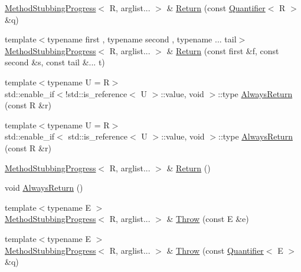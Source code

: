 \begin{DoxyCompactItemize}
\mbox{\hyperlink{structfakeit_1_1MethodStubbingProgress}{Method\+Stubbing\+Progress}}$<$ R, arglist... $>$ \& \mbox{\hyperlink{structfakeit_1_1MethodStubbingProgress_acb4d4db8208a8eaadff77e7cbf3775db}{Return}} (const \mbox{\hyperlink{structfakeit_1_1Quantifier}{Quantifier}}$<$ R $>$ \&q)
\item 
{\footnotesize template$<$typename first , typename second , typename ... tail$>$ }\\\mbox{\hyperlink{structfakeit_1_1MethodStubbingProgress}{Method\+Stubbing\+Progress}}$<$ R, arglist... $>$ \& \mbox{\hyperlink{structfakeit_1_1MethodStubbingProgress_ae8417ec5f29f70be1ae914755b05e4db}{Return}} (const first \&f, const second \&s, const tail \&... t)
\item 
{\footnotesize template$<$typename U  = R$>$ }\\std\+::enable\+\_\+if$<$!std\+::is\+\_\+reference$<$ U $>$\+::value, void $>$\+::type \mbox{\hyperlink{structfakeit_1_1MethodStubbingProgress_a268ca122b518c0a34e80535d8f457549}{Always\+Return}} (const R \&r)
\item 
{\footnotesize template$<$typename U  = R$>$ }\\std\+::enable\+\_\+if$<$ std\+::is\+\_\+reference$<$ U $>$\+::value, void $>$\+::type \mbox{\hyperlink{structfakeit_1_1MethodStubbingProgress_a84cf6a4bf307cf8d49efb69b014e9b11}{Always\+Return}} (const R \&r)
\item 
\mbox{\hyperlink{structfakeit_1_1MethodStubbingProgress}{Method\+Stubbing\+Progress}}$<$ R, arglist... $>$ \& \mbox{\hyperlink{structfakeit_1_1MethodStubbingProgress_a4743b7e25e98cd6a2be2c03b7a9416d4}{Return}} ()
\item 
void \mbox{\hyperlink{structfakeit_1_1MethodStubbingProgress_a3f1ecf87f8c73b7f3276786914579f8b}{Always\+Return}} ()
\item 
{\footnotesize template$<$typename E $>$ }\\\mbox{\hyperlink{structfakeit_1_1MethodStubbingProgress}{Method\+Stubbing\+Progress}}$<$ R, arglist... $>$ \& \mbox{\hyperlink{structfakeit_1_1MethodStubbingProgress_ae3da30d02ba5de4bfa82f51bba5602c3}{Throw}} (const E \&e)
\item 
{\footnotesize template$<$typename E $>$ }\\\mbox{\hyperlink{structfakeit_1_1MethodStubbingProgress}{Method\+Stubbing\+Progress}}$<$ R, arglist... $>$ \& \mbox{\hyperlink{structfakeit_1_1MethodStubbingProgress_a93c74210adfc0ec4662aff15f78834c7}{Throw}} (const \mbox{\hyperlink{structfakeit_1_1Quantifier}{Quantifier}}$<$ E $>$ \&q)

\end{DoxyCompactItemize}
